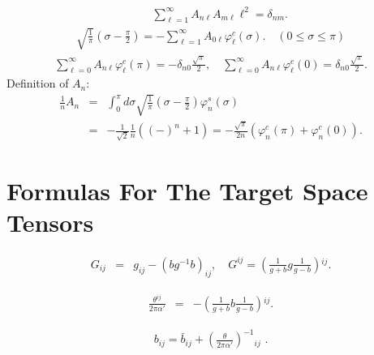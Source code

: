 \documentclass[a4paper,12pt]{article}
\newcommand{\nn}{\nonumber\\}
\newcommand{\co}{\varphi^c}
\newcommand{\si}{\varphi^s}
\begin{document}
\begin{eqnarray}
 \label{fA2}
&&\sum_{\ell=1}^\infty
A_{n\ell}A_{m\ell}{\ell^2} 
= \delta_{nm} .
\end{eqnarray}
\begin{eqnarray}
\sqrt{\frac{1}{\pi}}
\left(
\sigma-\frac{\pi}{2}
\right)
=
-\sum_{\ell =1}^\infty
A_{0\ell} \co_\ell(\sigma). \quad (0 \le \sigma \le \pi)
\end{eqnarray}
\begin{eqnarray}
 \label{aa}
\sum_{\ell=0}^\infty
A_{n \ell }\co_\ell(\pi) 
=- \delta_{n0} \frac{\sqrt{\pi}}{2},\quad 
\sum_{\ell=0}^\infty
A_{n \ell}\co_\ell(0)
 = \delta_{n0} \frac{\sqrt{\pi}}{2}.
\end{eqnarray}
Definition of $A_n$:
\begin{eqnarray}
\frac{1}{n}A_n &=&
\int_0^\pi d\sigma
\sqrt{ \frac{1}{\pi} }
\left(\sigma-\frac{\pi}{2}\right)
\si_n(\sigma) \nn
&=&
-\frac{1}{\sqrt{2}}\frac{1}{n} \left((-)^n+1\right)
= -\frac{\sqrt{\pi}}{2n}
\left( \co_n(\pi) + \co_n(0) \right).
\end{eqnarray}




\section{Formulas For The Target Space Tensors}



\begin{eqnarray}
 \label{AG}
G_{ij} &=& g_{ij} - (b g^{-1} b)_{ij}, \quad
G^{ij} =
\left(
\frac{1}{g+b} g \frac{1}{g-b}
\right)\!{}^{ij}.
\end{eqnarray}

\begin{eqnarray}
 \label{Atheta}
\frac{\theta^{ij}}{2\pi \alpha'}
&=& -  
\left(
\frac{1}{g+b} b \frac{1}{g-b}
\right)\!{}^{ij}.
\end{eqnarray}


\begin{eqnarray}
 \label{Abb}
b_{ij} = \bar{b}_{ij} + 
\left(
\frac{\theta}{2\pi\alpha'}
\right)^{-1}
\!\!\!\!\!\!{}_{ij} \,\, .
\end{eqnarray}
\end{document}
